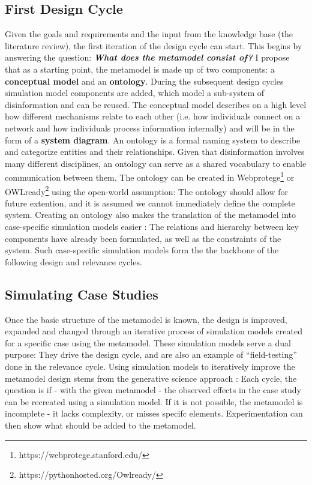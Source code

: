 \subsection{First Design Cycle}
Given the goals and requirements and the input from the knowledge base (the literature review), the first iteration of the design cycle can start. This begins by answering the question: \textbf{\textit{What does the metamodel consist of?}} I propose that as a starting point, the metamodel is made up of two components: a \textbf{conceptual model} and an \textbf{ontology}. During the subsequent design cycles simulation model components are added, which model a sub-system of disinformation and can be reused.  The conceptual model describes on a high level how different mechanisms relate to each other (i.e. how individuals connect on a network and how individuals process information internally) and will be in the form of a \textbf{system diagram}. An ontology is a formal naming system to describe and categorize entities and their relationships. Given that disinformation involves many different disciplines, an ontology can serve as a shared vocabulary to enable communication between them. The ontology can be created in Webprotege\footnote{https://webprotege.stanford.edu/} or OWLready\footnote{https://pythonhosted.org/Owlready/} using the open-world assumption: The ontology should allow for future extention, and it is assumed we cannot immediately define the complete system. Creating an ontology also makes the translation of the metamodel into case-specific simulation models easier \citep{Benjamin2006}: The relations and hierarchy between key components have already been formulated, as well as the constraints of the system. Such case-specific simulation models form the the backbone of the following design and relevance cycles.


\subsection{Simulating Case Studies}
Once the basic structure of the metamodel is known, the design is improved, expanded and changed through an iterative process of simulation models created for a specific case using the metamodel. These simulation models serve a dual purpose: They drive the design cycle, and are also an example of ``field-testing''  done in the relevance cycle.
Using simulation models to iteratively improve the metamodel design stems from the generative science approach \cite{Epstein2006}: Each cycle, the question is if - with the given metamodel - the observed effects in the case study can be recreated using a simulation model. If it is not possible, the metamodel is incomplete - it lacks complexity, or misses specifc elements. Experimentation can then show what should be added to the metamodel.\\


